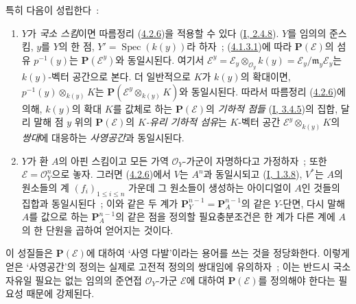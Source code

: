 특히 다음이 성립한다~:
\begin{enumerate}
  \item[1\textsuperscript{o}] $Y$가 \emph{국소 스킴}이면 따름정리
  (\hyperref[II.4.2.6-ko]{4.2.6})을 적용할 수 있다
  (\hyperref[I.2.4.8-ko]{I, 2.4.8}). $Y$를 임의의 준스킴, $y$를 $Y$의
  한 점, $Y'=\operatorname{Spec}(k(y))$라 하자~;
  (\hyperref[II.4.1.3.1-ko]{4.1.3.1})에 따라
  $\mathbf{P}(\mathcal{E})$의 섬유 $p^{-1}(y)$는
  $\mathbf{P}(\mathcal{E}^y)$와 동일시된다. 여기서
  $\mathcal{E}^y=\mathcal{E}_y\otimes_{\mathcal{O}_y}k(y)
  =\mathcal{E}_y/\mathfrak{m}_y\mathcal{E}_y$는 $k(y)$-벡터 공간으로
  본다. 더 일반적으로 $K$가 $k(y)$의 확대이면,
  $p^{-1}(y)\otimes_{k(y)}K$는
  $\mathbf{P}(\mathcal{E}^y\otimes_{k(y)}K)$와 동일시된다. 따라서
  따름정리 (\hyperref[II.4.2.6-ko]{4.2.6})에 의해, $k(y)$의 확대
  $K$를 값체로 하는 $\mathbf{P}(\mathcal{E})$의 \emph{기하적 점들}
  (\hyperref[I.3.4.5-ko]{I, 3.4.5})의 집합, 달리 말해 점 $y$ 위의
  $\mathbf{P}(\mathcal{E})$의 \emph{$K$-유리 기하적 섬유}는
  $K$-벡터 공간 $\mathcal{E}^y\otimes_{k(y)}K$의 \emph{쌍대}에
  대응하는 \emph{사영공간}과 동일시된다.
  \item[2\textsuperscript{o}] $Y$가 환 $A$의 아핀 스킴이고 모든 가역
  $\mathcal{O}_Y$-가군이 자명하다고 가정하자~; 또한
  $\mathcal{E}=\mathcal{O}_Y^n$으로 놓자. 그러면
  (\hyperref[II.4.2.6-ko]{4.2.6})에서 $V$는 $A^n$과 동일시되고
  (\hyperref[I.1.3.8-ko]{I, 1.3.8}), $V^*$는 $A$의 원소들의 계
  $(f_i)_{1\leq i\leq n}$ 가운데 그 원소들이 생성하는 아이디얼이
  $A$인 것들의 집합과 동일시된다~; 이와 같은 두 계가
  $\mathbf{P}_Y^{n-1}=\mathbf{P}_A^{n-1}$의 같은 $Y$-단면, 다시 말해
  $A$를 값으로 하는 $\mathbf{P}_A^{n-1}$의 같은 점을 정의할
  필요충분조건은 한 계가 다른 계에 $A$의 한 단원을 곱하여 얻어지는
  것이다.
\end{enumerate}

이 성질들은 $\mathbf{P}(\mathcal{E})$에 대하여 ‘사영 다발’이라는
용어를 쓰는 것을 정당화한다. 이렇게 얻은 ‘사영공간’의 정의는
실제로 고전적 정의의 쌍대임에 유의하자~; 이는 반드시 국소 자유일
필요는 없는 임의의 준연접 $\mathcal{O}_Y$-가군 $\mathcal{E}$에 대하여
$\mathbf{P}(\mathcal{E})$를 정의해야 한다는 필요성 때문에 강제된다.

